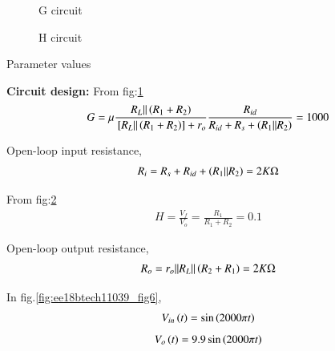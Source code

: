 \begin{enumerate}[label=\thesubsection.\arabic*.,ref=\thesubsection.\theenumi]
\begin{figure}[!h]
		\resizebox{\columnwidth}{!}{}
\caption{G circuit}
\label{fig:ee18btech11039_fig4}
\end{figure}

\begin{figure}[!h]
		\resizebox{\columnwidth}{!}{}
\caption{H circuit}
\label{fig:ee18btech11039_fig5}
\end{figure}

\begin{table}[!h]
\centering

\caption{Parameter values}
\label{table:ee18btech11039_tab2}
\end{table}

\textbf{Circuit design: }
From fig:\ref{fig:ee18btech11039_fig4}
\begin{align}
G = \mu \frac{R_L || \left(R_1 + R_2\right)}{{}\left[R_L || \left(R_1 + R_2\right)\right]+r_o} \frac{R_{id}}{R_{id}+R_s+\left(R_1||R_2\right)} = 1000
\end{align}

Open-loop input resistance,
\begin{align}
     R_i =  R_s + R_{id} + \left(R_1 || R_2\right) = 2K\ohm
\end{align}

From fig:\ref{fig:ee18btech11039_fig5}
\begin{align}
H = \frac{V_f}{V_o} = \frac{R_1}{R_1 + R_2} = 0.1
\end{align}

Open-loop output resistance,
\begin{align}
      R_o = r_o || R_L || \left(R_2 + R_1\right) = 2K\ohm
\end{align}

In fig.\ref{fig:ee18btech11039_fig6}, 
\begin{align}
    V_{in}\left(t\right) = \sin\left(2000\pi t\right)
\end{align}
\begin{align}
    V_{o}\left(t\right) = 9.9\sin\left(2000\pi t\right)
\end{align}


\end{enumerate}

